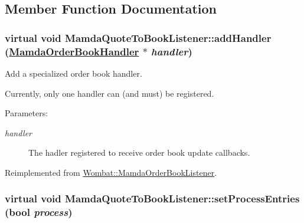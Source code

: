 \subsection{Member Function Documentation}
\hypertarget{classMamdaQuoteToBookListener_f789fd04752b2c25b04daa6888c33388}{
\subsubsection[addHandler]{\setlength{\rightskip}{0pt plus 5cm}virtual void Mamda\-Quote\-To\-Book\-Listener::add\-Handler (\hyperlink{classWombat_1_1MamdaOrderBookHandler}{Mamda\-Order\-Book\-Handler} $\ast$ {\em handler})}}
\label{classMamdaQuoteToBookListener_f789fd04752b2c25b04daa6888c33388}


Add a specialized order book handler. 

Currently, only one handler can (and must) be registered.

\begin{Desc}
\item[Parameters:]
\begin{description}
\item[{\em handler}]The hadler registered to receive order book update callbacks. \end{description}
\end{Desc}


Reimplemented from \hyperlink{classWombat_1_1MamdaOrderBookListener_81c34135bae76175b72fed83c3a6325c}{Wombat::Mamda\-Order\-Book\-Listener}.\hypertarget{classMamdaQuoteToBookListener_21f81f9500c986f88ea910b97f086b39}{
\subsubsection[setProcessEntries]{\setlength{\rightskip}{0pt plus 5cm}virtual void Mamda\-Quote\-To\-Book\-Listener::set\-Process\-Entries (bool {\em process})}}
\label{classMamdaQuoteToBookListener_21f81f9500c986f88ea910b97f086b39}


